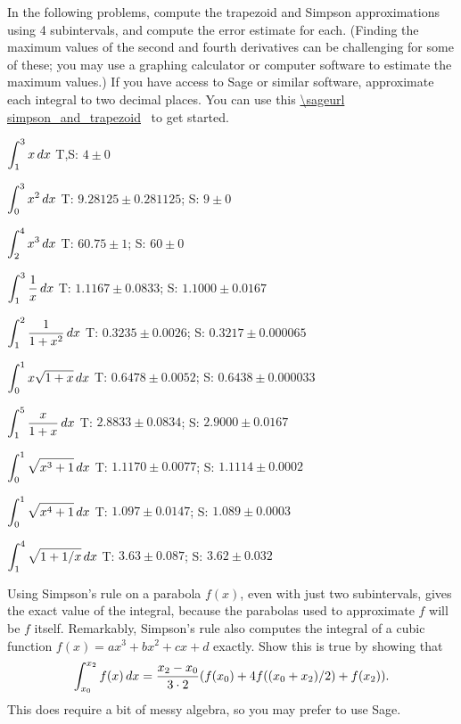 \exercises

In the following problems, compute the trapezoid and Simpson
approximations using 4 subintervals, and compute the error estimate
for each. (Finding the maximum values of the second and fourth
derivatives can be challenging for some of these; you may use a
graphing calculator or computer software to estimate the maximum
values.)  If you have access to Sage or similar software, approximate
each integral to two decimal places.  You can use this
\texonly
\expandafter\url\expandafter{\sageurl simpson_and_trapezoid}%
\endurl\ to get started.
\endtexonly
{}

\twocol

\exercise $\displaystyle\int_1^3 x\,dx$
\answer T,S: $4\pm0$
\endanswer
\endexercise

\exercise $\displaystyle\int_0^3 x^2\,dx$
\answer T: $9.28125\pm0.281125 $; S: $9\pm0$
\endanswer
\endexercise

\exercise $\displaystyle\int_2^4 x^3\,dx$
\answer T: $60.75\pm1$; S: $60\pm0$
\endanswer
\endexercise

\exercise $\displaystyle\int_1^3 {1\over x}\,dx$
\answer T: $1.1167\pm 0.0833$; S: $1.1000\pm 0.0167$
\endanswer
\endexercise

\exercise $\displaystyle\int_1^2 {1\over 1+x^2}\,dx$
\answer T: $0.3235\pm 0.0026$; S: $0.3217\pm 0.000065$
\endanswer
\endexercise

\exercise $\displaystyle\int_0^1 x\sqrt{1+x}\,dx$
\answer T: $0.6478\pm 0.0052$; S: $0.6438\pm 0.000033$
\endanswer
\endexercise

\exercise $\displaystyle\int_1^5 {x\over 1+x}\,dx$
\answer T: $2.8833\pm 0.0834$; S: $2.9000\pm 0.0167$
\endanswer
\endexercise

\exercise $\displaystyle\int_0^1 \sqrt{x^3+1}\,dx$
\answer T: $1.1170\pm 0.0077$; S: $1.1114\pm 0.0002$
\endanswer
\endexercise

\exercise $\displaystyle\int_0^1 \sqrt{x^4+1}\,dx$
\answer T: $1.097\pm 0.0147$; S: $1.089\pm 0.0003$
\endanswer
\endexercise

\exercise $\displaystyle\int_1^4 \sqrt{1+1/x}\,dx$
\answer T: $3.63\pm 0.087$; S: $3.62\pm 0.032$
\endanswer

\endtwocol

\msk
\endexercise

\exercise Using Simpson's rule on a parabola $f(x)$, even with just
two subintervals, gives the exact value of the integral, because the
parabolas used to approximate $f$ will be $f$ itself. Remarkably,
Simpson's rule also computes the integral of a cubic function
$f(x)=ax^3+bx^2+cx+d$ exactly. Show this is true by showing that
$$
  \int_{x_0}^{x_2}
  f(x)\,dx={x_2-x_0\over3\cdot2}(f(x_0)+4f((x_0+x_2)/2)+f(x_2)).
$$
This does require a bit of messy algebra, so you may prefer to use Sage.
\endexercise

\endexercises
